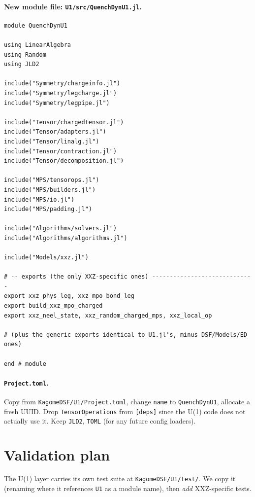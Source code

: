 \documentclass[11pt]{article}
\begin{document}
\paragraph{New module file: \texttt{U1/src/QuenchDynU1.jl}.}
\begin{lstlisting}
module QuenchDynU1

using LinearAlgebra
using Random
using JLD2

include("Symmetry/chargeinfo.jl")
include("Symmetry/legcharge.jl")
include("Symmetry/legpipe.jl")

include("Tensor/chargedtensor.jl")
include("Tensor/adapters.jl")
include("Tensor/linalg.jl")
include("Tensor/contraction.jl")
include("Tensor/decomposition.jl")

include("MPS/tensorops.jl")
include("MPS/builders.jl")
include("MPS/io.jl")
include("MPS/padding.jl")

include("Algorithms/solvers.jl")
include("Algorithms/algorithms.jl")

include("Models/xxz.jl")

# -- exports (the only XXZ-specific ones) -----------------------------
export xxz_phys_leg, xxz_mpo_bond_leg
export build_xxz_mpo_charged
export xxz_neel_state, xxz_random_charged_mps, xxz_local_op

# (plus the generic exports identical to U1.jl's, minus DSF/Models/ED ones)

end # module
\end{lstlisting}

\paragraph{\texttt{Project.toml}.}  Copy from \texttt{KagomeDSF/U1/Project.toml},
change \texttt{name} to \texttt{QuenchDynU1}, allocate a fresh UUID.  Drop
\texttt{TensorOperations} from \texttt{[deps]} since the U(1) code does not
actually use it.  Keep \texttt{JLD2}, \texttt{TOML} (for any future config
loaders).

\section{Validation plan}

The U(1) layer carries its own test suite at \texttt{KagomeDSF/U1/test/}.
We copy it (renaming where it references \texttt{U1} as a module name), then
\emph{add} XXZ-specific tests.
\end{document}
